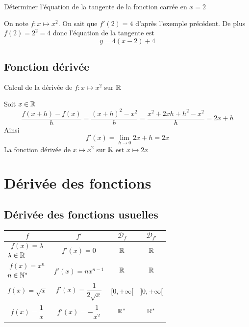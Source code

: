 \begin{exemple}
Déterminer l'équation de la tangente de la fonction carrée en $x=2$\newline

On note $f:x\mapsto x^2$. On sait que $f'(2) = 4$ d'après l'exemple précédent. De plus $f(2) = 2^2 = 4$ donc l'équation de la tangente est 
$$y = 4(x-2) + 4$$
\end{exemple}
\subsection{Fonction dérivée}
\newline

\begin{exemple}
Calcul de la dérivée de $f:x\mapsto x^2$ sur $\mathbb{R}$\newline

Soit $x\in\mathbb{R}$
$$\dfrac{f(x+h) - f(x)}{h} = \dfrac{(x+h)^2 - x^2}{h} = \dfrac{x^2 + 2xh + h^2 - x^2}{h} = 2x + h$$
Ainsi 
$$f'(x) = \lim_{h\rightarrow 0} 2x+h = 2x$$
La fonction dérivée de $x\mapsto x^2$ sur $\mathbb{R}$ est $x\mapsto 2x$ 
\end{exemple}
\section{Dérivée des fonctions}
\subsection{Dérivée des fonctions usuelles}
\begin{tabularx}{\linewidth}{| X | X | X | X |}
\hline
$$f$$ & $$f'$$ & $$\mathscr{D}_f$$ & $$\mathscr{D}_{f'}$$ \\ \hline
$$f(x) = \lambda$$ $\lambda \in \mathbb{R}$ & $$f'(x) = 0$$ & $$\mathbb{R}$$ & $$\mathbb{R}$$ \\ \hline
$$f(x) = x^n$$ $n \in \mathbb{N}^*$ & $$f'(x) = n x^{n-1}$$ & $$\mathbb{R}$$ & $$\mathbb{R}$$ \\ \hline
$$f(x) = \sqrt{x}$$ & $$f'(x) = \dfrac{1}{2\sqrt{x}} $$ & $$[0,+\infty[$$ & $$]0,+\infty[$$ \\ \hline
$$f(x) = \dfrac{1}{x}$$ & $$f'(x) = -\dfrac{1}{x^2}$$ & $$\mathbb{R}^*$$ & $$\mathbb{R}^*$$ \\ \hline
\end{tabularx}
